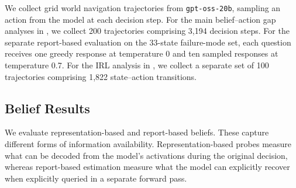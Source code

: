 \documentclass{article}
\begin{document}
We collect grid world navigation trajectories from \texttt{gpt-oss-20b}, sampling an action from the model at each decision step. 
For the main belief--action gap analyses in , we collect 200 trajectories comprising 3,194 decision steps. 
For the separate report-based evaluation on the 33-state failure-mode set, each question receives one greedy response at temperature 0 and ten sampled responses at temperature 0.7.
For the IRL analysis in , we collect a separate set of 100 trajectories comprising 1,822 state--action transitions.





\subsection{Belief Results}
\label{sec:belief-results}
We evaluate representation-based and report-based beliefs.
These capture different forms of information availability. 
Representation-based probes measure what can be decoded from the model's activations during the original decision, whereas report-based estimation measure what the model can explicitly recover when explicitly queried in a separate forward pass.
\end{document}
